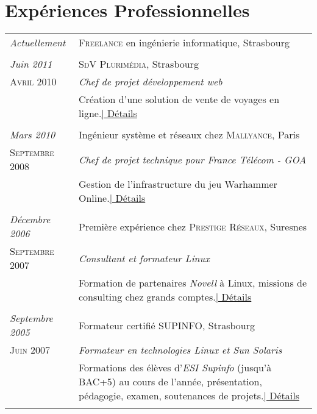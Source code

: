 \documentclass[a4paper,10pt]{article}
\begin{document}
\section{Expériences Professionnelles}
\begin{tabular}{p{}|p{}}
\emph{Actuellement} & \textsc{Freelance} en ingénierie informatique, Strasbourg \\\\
	
\emph{Juin 2011} & \textsc{SdV Plurimédia}, Strasbourg \\\textsc{Avril 2010}&\emph{Chef de projet développement web}\\&\footnotesize{Création d'une solution de vente de voyages en ligne.\hyperlink{sdv}{\hfill | \footnotesize Détails}}\\\multicolumn{2}{c}{} \\

 \emph{Mars 2010} & Ingénieur système et réseaux chez \textsc{Mallyance}, Paris \\\textsc{Septembre 2008}&\emph{Chef de projet technique pour France Télécom - GOA}\\&\footnotesize{Gestion de l'infrastructure du jeu Warhammer Online.\hyperlink{mallyance}{\hfill | \footnotesize Détails}}\\\multicolumn{2}{c}{} \\
 \emph{Décembre 2006} & Première expérience chez \textsc{Prestige Réseaux}, Suresnes \\\textsc{Septembre 2007}&\emph{Consultant et formateur Linux}\\&\footnotesize{Formation de partenaires \emph{Novell} à Linux, missions de consulting chez grands comptes.\newline \hyperlink{prestige}{\hfill | \footnotesize Détails}}\\\multicolumn{2}{c}{} \\
 \emph{Septembre 2005} & Formateur certifié \textsc{SUPINFO}, Strasbourg \\\textsc{Juin 2007}&\emph{Formateur en technologies Linux et Sun Solaris}\\&\footnotesize{Formations des élèves d'\emph{ESI Supinfo} (jusqu'à BAC+5) au cours de l'année, présentation, pédagogie, examen, soutenances de projets.\newline \hyperlink{supinfo}{\hfill | \footnotesize Détails}}\\\multicolumn{2}{c}{}
\end{tabular}
\end{document}
